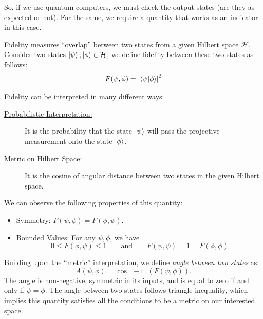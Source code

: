 \documentclass[11pt, oneside, listof=totoc]{scrbook}
\renewcommand{\H}{\mathcal{H}}
\begin{document}
So, if we use quantum computers, we must check the output states (are they as expected or not). For the same, we require a quantity that works as an indicator in this case.
\begin{definition}[Fidelity]
    Fidelity measures ``overlap'' between two states from a given Hilbert space \(\H\). Consider two states \(\ket{\psi}, \ket{\phi} \in \H\); we define fidelity between these two states as follows:
    \begin{equation}
        F(\psi, \phi) = \abs{\ip{\psi}{\phi}}^2
    \end{equation}
\end{definition}
Fidelity can be interpreted in many different ways:
\begin{description}
    \item[\normalfont \uline{Probabilistic Interpretation:}] It is the probability that the state \(\ket{\psi}\) will pass the projective measurement onto the state \(\ket{\phi}\).
    \item[\normalfont \uline{Metric on Hilbert Space:}] It is the cosine of angular distance between two states in the given Hilbert space.\label{info:metric}
\end{description}

\noindent We can observe the following properties of this quantity:
\begin{itemize}
    \item {\sffamily Symmetry:} \(F(\psi, \phi) = F(\phi, \psi)\).
    \item {\sffamily Bounded Values:} For any \(\psi, \phi\), we have
          \begin{equation*}
              0 \le F(\phi, \psi) \le 1 \qquad \mbox{and} \qquad F(\psi, \psi) = 1 = F(\phi, \phi)
          \end{equation*}
\end{itemize}

\begin{remark}
    Building upon the ``metric'' interpretation, we define \emph{angle between two states} as:
    \begin{equation*}
        A(\psi, \phi) = \cos[-1](F(\psi, \phi)).
    \end{equation*}
    The angle is non-negative, symmetric in its inputs, and is equal to zero if and only if $\psi = \phi$. The angle between two states follows triangle inequality, which implies this quantity satisfies all the conditions to be a metric on our interested space.
\end{remark}
\end{document}
